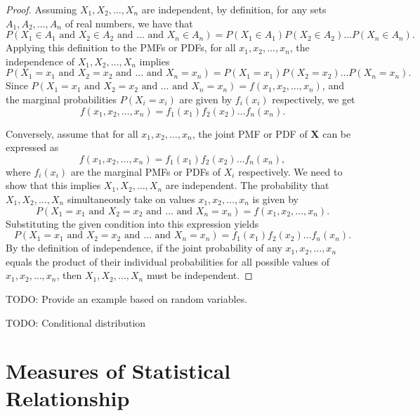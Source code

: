 \begin{proof}
Assuming \(X_1, X_2, \ldots, X_n\) are independent, by definition, for any sets \(A_1, A_2, \ldots, A_n\) of real numbers, we have that 
\[
P(X_1 \in A_1 \text{ and } X_2 \in A_2 \text{ and } \ldots \text{ and } X_n \in A_n) = P(X_1 \in A_1)P(X_2 \in A_2)\ldots P(X_n \in A_n).
\]
Applying this definition to the PMFs or PDFs, for all \(x_1, x_2, \ldots, x_n\), the independence of \(X_1, X_2, \ldots, X_n\) implies 
\[
P(X_1 = x_1 \text{ and } X_2 = x_2 \text{ and } \ldots \text{ and } X_n = x_n) = P(X_1 = x_1)P(X_2 = x_2)\ldots P(X_n = x_n).
\]
Since \(P(X_1 = x_1 \text{ and } X_2 = x_2 \text{ and } \ldots \text{ and } X_n = x_n) = f(x_1, x_2, \ldots, x_n)\), and the marginal probabilities \(P(X_i = x_i)\) are given by \(f_i(x_i)\) respectively, we get 
\[
f(x_1, x_2, \ldots, x_n) = f_1(x_1) f_2(x_2) \ldots f_n(x_n).
\]

Conversely, assume that for all \(x_1, x_2, \ldots, x_n\), the joint PMF or PDF of \(\mathbf{X}\) can be expressed as 
\[
f(x_1, x_2, \ldots, x_n) = f_1(x_1) f_2(x_2) \ldots f_n(x_n),
\]
where \(f_i(x_i)\) are the marginal PMFs or PDFs of \(X_i\) respectively. We need to show that this implies \(X_1, X_2, \ldots, X_n\) are independent. The probability that \(X_1, X_2, \ldots, X_n\) simultaneously take on values \(x_1, x_2, \ldots, x_n\) is given by 
\[
P(X_1 = x_1 \text{ and } X_2 = x_2 \text{ and } \ldots \text{ and } X_n = x_n) = f(x_1, x_2, \ldots, x_n).
\]
Substituting the given condition into this expression yields 
\[
P(X_1 = x_1 \text{ and } X_2 = x_2 \text{ and } \ldots \text{ and } X_n = x_n) = f_1(x_1) f_2(x_2) \ldots f_n(x_n).
\]
By the definition of independence, if the joint probability of any \(x_1, x_2, \ldots, x_n\) equals the product of their individual probabilities for all possible values of \(x_1, x_2, \ldots, x_n\), then \(X_1, X_2, \ldots, X_n\) must be independent.
\end{proof}

\begin{example}
{\color{red} TODO: Provide an example based on random variables.}
\end{example}


{\color{red} TODO: Conditional distribution}


%
%

\section{Measures of Statistical Relationship}
\label{sec:measures_statistical_relationship}

